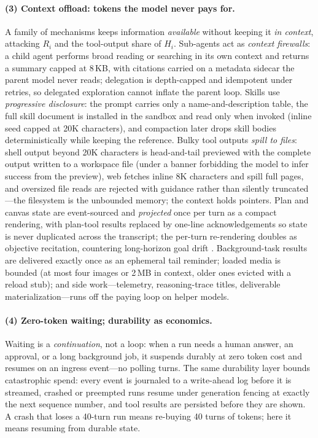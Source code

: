\documentclass[11pt]{article}
\begin{document}
\paragraph{(3) Context offload: tokens the model never pays for.}
A family of mechanisms keeps information \emph{available} without keeping it \emph{in context}, attacking $R_i$ and the tool-output share of $H_i$. Sub-agents act as \emph{context firewalls}: a child agent performs broad reading or searching in its own context and returns a summary capped at 8\,KB, with citations carried on a metadata sidecar the parent model never reads; delegation is depth-capped and idempotent under retries, so delegated exploration cannot inflate the parent loop. Skills use \emph{progressive disclosure}: the prompt carries only a name-and-description table, the full skill document is installed in the sandbox and read only when invoked (inline seed capped at 20K characters), and compaction later drops skill bodies deterministically while keeping the reference. Bulky tool outputs \emph{spill to files}: shell output beyond 20K characters is head-and-tail previewed with the complete output written to a workspace file (under a banner forbidding the model to infer success from the preview), web fetches inline 8K characters and spill full pages, and oversized file reads are rejected with guidance rather than silently truncated---the filesystem is the unbounded memory; the context holds pointers. Plan and canvas state are event-sourced and \emph{projected} once per turn as a compact rendering, with plan-tool results replaced by one-line acknowledgements so state is never duplicated across the transcript; the per-turn re-rendering doubles as objective recitation, countering long-horizon goal drift \cite{manus}. Background-task results are delivered exactly once as an ephemeral tail reminder; loaded media is bounded (at most four images or 2\,MB in context, older ones evicted with a reload stub); and side work---telemetry, reasoning-trace titles, deliverable materialization---runs off the paying loop on helper models.

\paragraph{(4) Zero-token waiting; durability as economics.}
Waiting is a \emph{continuation}, not a loop: when a run needs a human answer, an approval, or a long background job, it suspends durably at zero token cost and resumes on an ingress event---no polling turns. The same durability layer bounds catastrophic spend: every event is journaled to a write-ahead log before it is streamed, crashed or preempted runs resume under generation fencing at exactly the next sequence number, and tool results are persisted before they are shown. A crash that loses a 40-turn run means re-buying 40 turns of tokens; here it means resuming from durable state.
\end{document}
